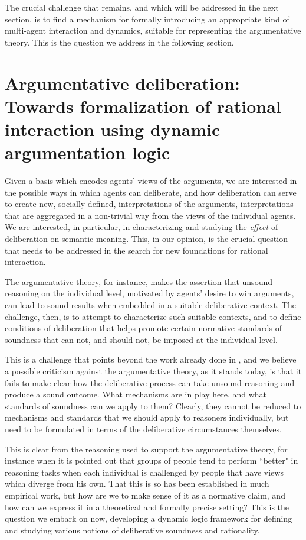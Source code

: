 \documentclass[greybox]{svmult}
\begin{document}
The crucial challenge that remains, and which will be addressed in the next section, is to find a mechanism for formally introducing an appropriate kind of multi-agent interaction and dynamics, suitable for representing the argumentative theory. This is the question we address in the following section.

\section{Argumentative deliberation: Towards formalization of rational interaction using dynamic argumentation logic}\label{sec:ddl}

Given a basis which encodes agents' views of the arguments, we are interested in the possible ways in which agents can deliberate, and how deliberation can serve to create new, socially defined, interpretations of the arguments, interpretations that are aggregated in a non-trivial way from the views of the individual agents.  We are interested, in particular, in characterizing and studying the \emph{effect} of deliberation on semantic meaning. This, in our opinion, is the crucial question that needs to be addressed in the search for new foundations for rational interaction.

The argumentative theory, for instance, makes the assertion that unsound reasoning on the individual level, motivated by agents' desire to win arguments, can lead to sound results when embedded in a suitable deliberative context. The challenge, then, is to attempt to characterize such suitable contexts, and to define conditions of deliberation that helps promote certain normative standards of soundness that can not, and should not, be imposed at the individual level. 

This is a challenge that points beyond the work already done in \cite{whyreason}, and we believe a possible criticism against the argumentative theory, as it stands today, is that it fails to make clear how the deliberative process can take unsound reasoning and produce a sound outcome.  What mechanisms are in play here, and what standards of soundness can we apply to them? Clearly, they cannot be reduced to mechanisms and standards that we should apply to reasoners individually, but need to be formulated in terms of the deliberative circumstances themselves.

This is clear from the reasoning used to support the argumentative theory, for instance when it is pointed out that groups of people tend to perform ``better" in reasoning tasks when each individual is challenged by people that have views which diverge from his own. That this is so has been established in much empirical work, but how are we to make sense of it as a normative claim, and how can we express it in a theoretical and formally precise setting? This is the question we embark on now, developing a dynamic logic framework for defining and studying various notions of deliberative soundness and rationality.
\end{document}
